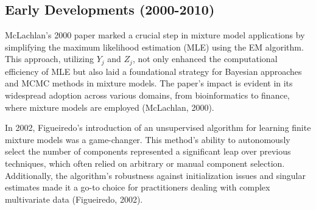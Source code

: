 \documentclass{article}
\begin{document}



%

\subsection*{Early Developments (2000-2010)}

McLachlan's 2000 paper marked a crucial step in mixture model applications by simplifying the maximum likelihood estimation (MLE) using the EM algorithm. This approach, utilizing $Y_j$ and $Z_j$, not only enhanced the computational efficiency of MLE but also laid a foundational strategy for Bayesian approaches and MCMC methods in mixture models. The paper’s impact is evident in its widespread adoption across various domains, from bioinformatics to finance, where mixture models are employed (McLachlan, 2000).

In 2002, Figueiredo's introduction of an unsupervised algorithm for learning finite mixture models was a game-changer. This method's ability to autonomously select the number of components represented a significant leap over previous techniques, which often relied on arbitrary or manual component selection. Additionally, the algorithm's robustness against initialization issues and singular estimates made it a go-to choice for practitioners dealing with complex multivariate data (Figueiredo, 2002).
\end{document}
